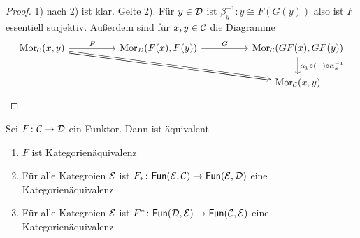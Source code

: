 \begin{proof}
    1) nach 2) ist klar. Gelte 2). Für $y\in\mathcal{D}$ ist $\beta_y^{-1}\colon y\cong F(G(y))$ also ist $F$ essentiell surjektiv. Außerdem sind für $x,y\in\mathcal{C}$ die Diagramme 
    $$%
\begin{tikzcd}
{\Mor_\calC(x,y)} \arrow[rrrrd, no head, Rightarrow] \arrow[rr, "F"] &  & {\Mor_\calD(F(x),F(y))} \arrow[rr, "G"] &  & {\Mor_\calC(GF(x),GF(y))} \arrow[d, "\alpha_y\circ (-)\circ\alpha_x^{-1}"] \\
                                                                     &  &                                         &  & {\Mor_\calC(x,y)}                                                         
\end{tikzcd}$$
\end{proof}
\begin{Bem}
    Sei $F\colon \mathcal{C}\to\mathcal{D}$ ein Funktor. Dann ist äquivalent 
    \begin{enumerate}
        \item $F$ ist Kategorienäquivalenz
        \item Für alle Kategroien $\mathcal{E}$ ist $F_*\colon \mathsf{Fun}(\mathcal{E},\mathcal{C})\to \mathsf{Fun}(\mathcal{E},\mathcal{D})$ eine Kategorienäquivalenz
        \item Für alle Kategroien $\mathcal{E}$ ist $F^*\colon \mathsf{Fun}(\mathcal{D},\mathcal{E})\to \mathsf{Fun}(\mathcal{C},\mathcal{E})$ eine Kategorienäquivalenz    \end{enumerate}
\end{Bem}
